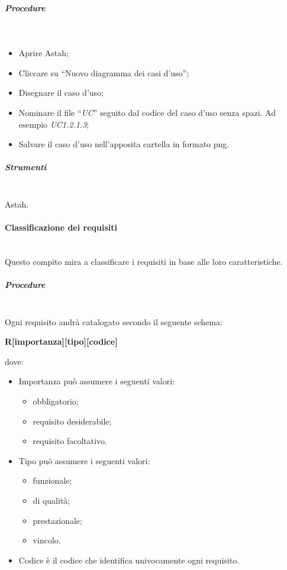 \subparagraph{Procedure} \hfill \\
\begin{itemize}
\item Aprire Astah;
\item Cliccare su ``Nuovo diagramma dei casi d'uso'';
\item Disegnare il caso d'uso;
\item Nominare il file ``\textit{UC}'' seguito dal codice del caso d'uso senza spazi. Ad esempio \textit{UC1.2.1.3};
\item Salvare il caso d'uso nell'apposita cartella in formato png.

\end{itemize}


\subparagraph{Strumenti} \hfill \\
Astah.



\paragraph{Classificazione dei requisiti} \hfill \\
Questo compito mira a classificare i requisiti in base alle loro caratteristiche.

\subparagraph{Procedure} \hfill \\
Ogni requisito andrà catalogato secondo il seguente schema:

\begin{center}
\textbf{R[importanza][tipo][codice]}
\end{center}
dove:
\begin{itemize}
\item Importanza può assumere i seguenti valori:
\begin{itemize}
\item {}  obbligatorio;
\item {} requisito desiderabile;
\item {} requisito facoltativo.
\end{itemize}
\item Tipo può assumere i seguenti valori:
\begin{itemize}
\item {} funzionale;
\item {} di qualità;
\item {} prestazionale;
\item {} vincolo.
\end{itemize}
\item Codice è il codice che identifica univocamente ogni requisito.
\end{itemize}

